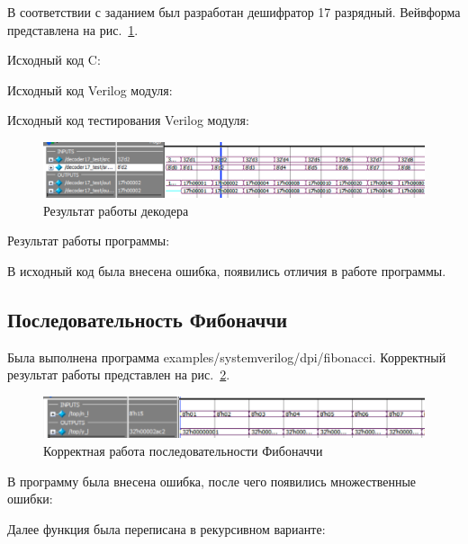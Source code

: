 \documentclass[a4paper,14pt]{article}
\begin{document}
    В соответствии с заданием был разработан дешифратор 17 разрядный.
    Вейвформа представлена на рис.~\ref{fig:02_decoder}.

    Исходный код C:
    {\small {}}

    Исходный код Verilog модуля:
    {\small {}}

    Исходный код тестирования Verilog модуля:
    {\small {}}

    \begin{figure}[H]
        \centering
        \includegraphics[width=\linewidth]{images/02_decoder}
        \caption{Результат работы декодера}
        \label{fig:02_decoder}
    \end{figure}

    Результат работы программы:
    {\small {}}

    В исходный код была внесена ошибка, появились отличия в работе программы.
    {\small {}}

    \subsection{Последовательность Фибоначчи}

    Была выполнена программа examples/systemverilog/dpi/fibonacci.
    Корректный результат работы представлен на рис.~\ref{fig:03_fib}.

    \begin{figure}[H]
        \centering
        \includegraphics[width=\linewidth]{images/03_fib}
        \caption{Корректная работа последовательности Фибоначчи}
        \label{fig:03_fib}
    \end{figure}

    В программу была внесена ошибка, после чего появились множественные ошибки:
    {\small {}}

    Далее функция была переписана в рекурсивном варианте:
    {\small {}}
\end{document}
